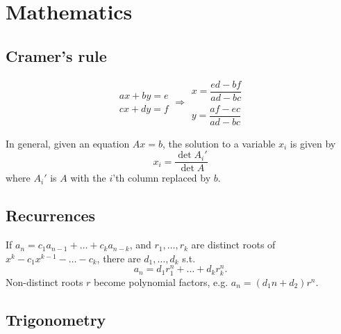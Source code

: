 
\chapter{Mathematics}



\section{Cramer's rule}
\[\begin{aligned}ax+by=e\\cx+dy=f\end{aligned}
\Rightarrow
\begin{aligned}x=\dfrac{ed-bf}{ad-bc}\\y=\dfrac{af-ec}{ad-bc}\end{aligned}\]

In general, given an equation $Ax = b$, the solution to a variable $x_i$ is given by
\[x_i = \frac{\det A_i'}{\det A} \]
where $A_i'$ is $A$ with the $i$'th column replaced by $b$.

\section{Recurrences}
If $a_n = c_1 a_{n-1} + \dots + c_k a_{n-k}$, and $r_1, \dots, r_k$ are distinct roots of $x^k - c_1 x^{k-1} - \dots - c_k$, there are $d_1, \dots, d_k$ s.t.
\[a_n = d_1r_1^n + \dots + d_kr_k^n. \]
Non-distinct roots $r$ become polynomial factors, e.g. $a_n = (d_1n + d_2)r^n$.

\section{Trigonometry}


